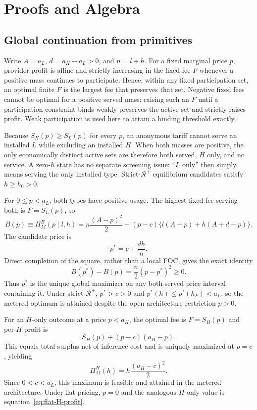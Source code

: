 \section{Proofs and Algebra}\label{app:proofs}

\subsection{Global continuation from primitives}\label{app:global-continuation}

Write $A=a_L$, $d=a_H-a_L>0$, and $n=l+h$. For a fixed marginal price $p$, provider profit is affine and strictly increasing in the fixed fee $F$ whenever a positive mass continues to participate. Hence, within any fixed participation set, an optimal finite $F$ is the largest fee that preserves that set. Negative fixed fees cannot be optimal for a positive served mass: raising such an $F$ until a participation constraint binds weakly preserves the active set and strictly raises profit. Weak participation is used here to attain a binding threshold exactly.

Because $S_H(p)\geq S_L(p)$ for every $p$, an anonymous tariff cannot serve an installed $L$ while excluding an installed $H$. When both masses are positive, the only economically distinct active sets are therefore both served, $H$ only, and no service. A zero-$h$ state has no separate screening issue: ``$L$ only'' then simply means serving the only installed type. Strict-$\mathcal R^+$ equilibrium candidates satisfy $h\geq h_0>0$.

For $0\leq p<a_L$, both types have positive usage. The highest fixed fee serving both is $F=S_L(p)$, so
\[
 B(p)\equiv\Pi_M^B(p\mid l,h)
 =n\frac{(A-p)^2}{2}+(p-c)\{l(A-p)+h(A+d-p)\}.
\]
The candidate price is
\[
 p^*=c+\frac{dh}{n}.
\]
Direct completion of the square, rather than a local FOC, gives the exact identity
\begin{equation}
 B(p^*)-B(p)=\frac{n}{2}(p-p^*)^2\geq0.
 \label{eq:square-loss}
\end{equation}
Thus $p^*$ is the unique global maximizer on any both-served price interval containing it. Under strict $\mathcal R^+$, $p^*>c>0$ and $p^*(h)\leq p^*(h_F)<a_L$, so the metered optimum is attained despite the open architecture restriction $p>0$.

For an $H$-only outcome at a price $p<a_H$, the optimal fee is $F=S_H(p)$ and per-$H$ profit is
\[
 S_H(p)+(p-c)(a_H-p).
\]
This equals total surplus net of inference cost and is uniquely maximized at $p=c$, yielding
\[
 \Pi_M^H(h)=h\frac{(a_H-c)^2}{2}.
\]
Since $0<c<a_L$, this maximum is feasible and attained in the metered architecture. Under flat pricing, $p=0$ and the analogous $H$-only value is equation~\eqref{eq:flat-H-profit}.

